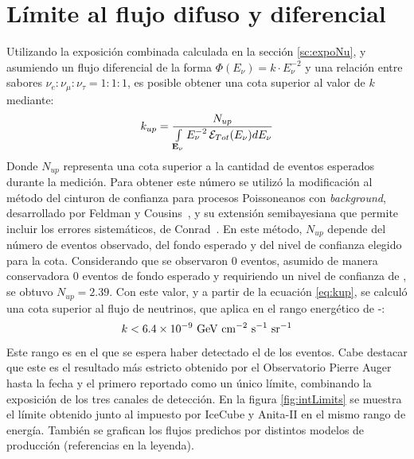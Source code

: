 	\section{L\'imite al flujo difuso y diferencial}
	
	Utilizando la exposici\'on combinada calculada en la secci\'on \ref{sc:expoNu}, y asumiendo un flujo diferencial de la forma $\Phi(E_\nu)= k\cdot E_\nu^{-2}$ y una relaci\'on entre sabores $\nu_e:\nu_\mu:\nu_\tau=1:1:1$, es posible obtener una cota superior al valor de $k$ mediante:
	\begin{equation}
	 k_{up}=\frac{N_{up}}{\int\limits_{\mathbf{E_{\nu}}} E_\nu^{-2}\,{\cal E}_{Tot}(E_\nu) dE_\nu}
	 \label{eq:kup}
	\end{equation}
	Donde $N_{up}$ representa una cota superior a la cantidad de eventos esperados durante la medici\'on.
	Para obtener este n\'umero se utiliz\'o la modificaci\'on al m\'etodo del cinturon de confianza para procesos Poissoneanos con \emph{background}, desarrollado por Feldman y Cousins~\cite{cite:Feldman-Cousins}, y su extensi\'on semibayesiana que permite incluir los errores sistem\'aticos, de Conrad~\cite{cite:Conrad_limit}.
	En este m\'etodo, $N_{up}$ depende del n\'umero de eventos observado, del fondo esperado y del nivel de confianza elegido para la cota.
	Considerando que se observaron 0 eventos, asumido de manera conservadora 0 eventos de fondo esperado y requiriendo un nivel de confianza de , se obtuvo $N_{up}=2.39$.
	Con este valor, y a partir de la ecuaci\'on \ref{eq:kup}, se calcul\'o una cota superior al flujo de neutrinos, que aplica en el rango energ\'etico de -:
	\begin{equation}
	k < 6.4 \times 10^{-9}~{\rm GeV~cm^{-2}~s^{-1}~sr^{-1}}
	\label{eq:limitePosta}
	\end{equation}
	Este rango es en el que se espera haber detectado el  de los eventos.
	Cabe destacar que este es el resultado m\'as estricto obtenido por el Observatorio Pierre Auger hasta la fecha y el primero reportado como un \'unico l\'imite, combinando la exposici\'on de los tres canales de detecci\'on.
	En la figura \ref{fig:intLimits} se muestra el límite obtenido junto al impuesto por IceCube y Anita-II en el mismo rango de energía.
	Tambi\'en se grafican los flujos predichos por distintos modelos de producci\'on (referencias en la leyenda).
